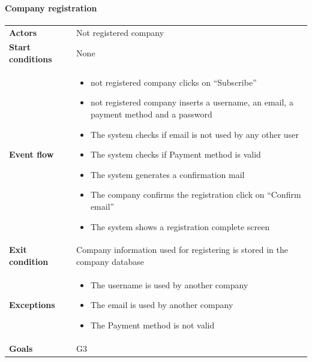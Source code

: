 \paragraph{Company registration}
\begin{center}
\begin{table}[H]
\centering
\begin{tabular}{l|p{}}
\textbf{Actors} & Not registered company \\
\textbf{Start conditions} & None \\


\textbf{Event flow}  & \begin{minipage}[t]{0.7\textwidth}
    \begin{itemize}
        \item not registered company clicks on “Subscribe”
\item not registered company inserts a username, an email, a payment method and a password
\item The system checks if email is not used by any other user
\item The system checks if Payment method is valid
\item The system generates a confirmation mail
\item The company confirms the registration click on “Confirm email”
\item The system shows a registration complete screen
    \end{itemize}
    
\end{minipage}\\ 

\textbf{Exit condition} & Company information used for registering is stored in the company database \\
\textbf{Exceptions} & \begin{minipage}[t]{0.7\textwidth}
    \begin{itemize}
        \item The username is used by another company
\item The email is used by another company
\item The Payment method is not valid

    \end{itemize}
    
\end{minipage}\\
\textbf{Goals} & G3 
\end{tabular}

\end{table}
\end{center}

